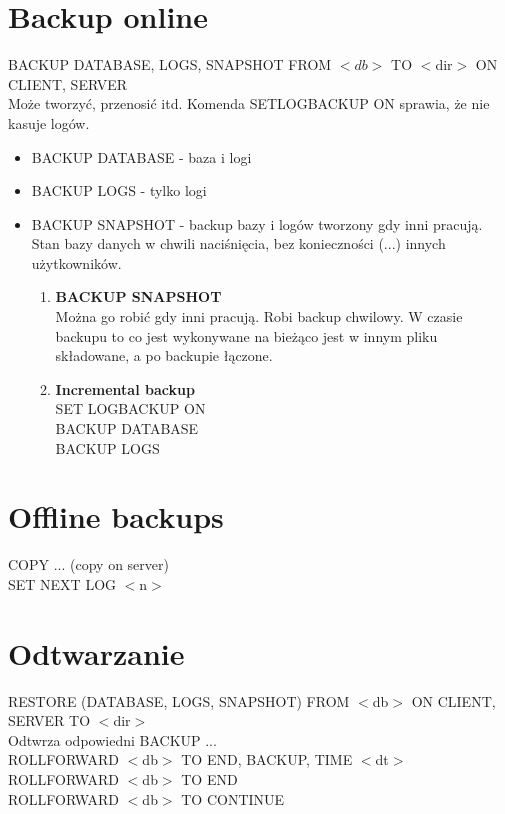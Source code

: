 \documentclass[a4paper,twoside]{article}
\begin{document}
  	\section*{Backup online} \noindent 
  	BACKUP {DATABASE, LOGS, SNAPSHOT} FROM \(<db>\) TO $ < $dir$ > $ ON {CLIENT, SERVER}\\
  	Może tworzyć, przenosić itd.
  	Komenda SETLOGBACKUP ON sprawia, że nie kasuje logów.
  	\begin{itemize}
  		\item BACKUP DATABASE - baza i logi
  		\item BACKUP LOGS - tylko logi
  		\item BACKUP SNAPSHOT - backup bazy i logów tworzony gdy inni pracują. Stan bazy danych w chwili naciśnięcia, bez konieczności (...) innych użytkowników.
	  	\begin{enumerate}
	  		\item \textbf{BACKUP SNAPSHOT}\\
	  		Można go robić gdy inni pracują. Robi backup chwilowy. W czasie backupu to co jest wykonywane na bieżąco jest w innym pliku składowane, a po backupie łączone.
	  		\item \textbf{Incremental backup}\\
	  		SET LOGBACKUP ON\\
	  		BACKUP DATABASE\\
	  		BACKUP LOGS
	  	\end{enumerate}
  	\end{itemize}
  	\section*{Offline backups} \noindent 
  	COPY ... (copy on server)\\
  	SET NEXT LOG $ < $n$ > $\\
  	\section*{Odtwarzanie} \noindent 
  	RESTORE (DATABASE, LOGS, SNAPSHOT) FROM $ < $db$ > $  ON {CLIENT, SERVER} TO $ < $dir$ > $\\
  	Odtwrza odpowiedni BACKUP ...\\
  	ROLLFORWARD $ < $db$ > $ TO {END, BACKUP, TIME $ < $dt$ > $}\\
  	ROLLFORWARD $ < $db$ > $ TO END\\
  	ROLLFORWARD $ < $db$ > $ TO CONTINUE
\end{document}
